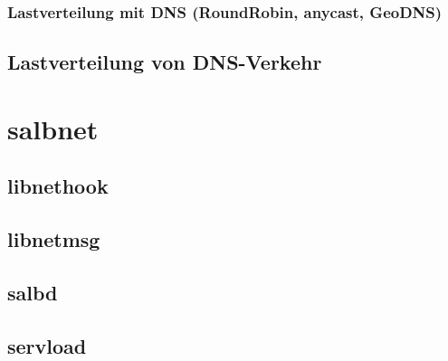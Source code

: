\documentclass[a4paper, 11pt, toc=bibliography, toc=listof]{scrbook}
\begin{document}

				\subsubsection{Lastverteilung mit DNS (RoundRobin, anycast, GeoDNS)} %
				\label{ssub:Lastverteilung mit DNS (RoundRobin, anycast, GeoDNS)}
				

			
			\subsection{Lastverteilung von DNS-Verkehr} %
			\label{sub:Lastverteilung von DNS-Verkehr}
			


		\section{salbnet} %
		\label{sec:salbnet}

			\subsection{libnethook} %
			\label{sub:libnethook}
			

			\subsection{libnetmsg} %
			\label{sub:libnetmsg}
			
			
			\subsection{salbd} %
			\label{sub:salbd}
				

			\subsection{servload} %
			\label{sub:servload}
				
\end{document}
